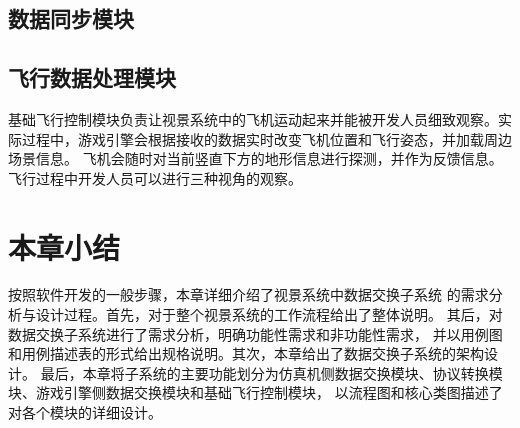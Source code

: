 \subsection{数据同步模块}
\subsection{飞行数据处理模块}
基础飞行控制模块负责让视景系统中的飞机运动起来并能被开发人员细致观察。实际过程中，游戏引擎会根据接收的数据实时改变飞机位置和飞行姿态，并加载周边场景信息。
飞机会随时对当前竖直下方的地形信息进行探测，并作为反馈信息。飞行过程中开发人员可以进行三种视角的观察。

\section{本章小结}
按照软件开发的一般步骤，本章详细介绍了视景系统中数据交换子系统
的需求分析与设计过程。首先，对于整个视景系统的工作流程给出了整体说明。
其后，对数据交换子系统进行了需求分析，明确功能性需求和非功能性需求，
并以用例图和用例描述表的形式给出规格说明。其次，本章给出了数据交换子系统的架构设计。
最后，本章将子系统的主要功能划分为仿真机侧数据交换模块、协议转换模块、游戏引擎侧数据交换模块和基础飞行控制模块，
以流程图和核心类图描述了对各个模块的详细设计。